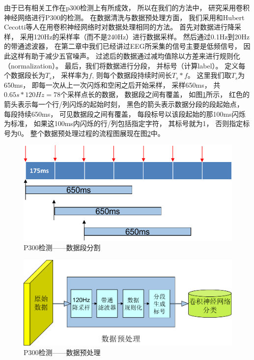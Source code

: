由于已有相关工作在p300检测上有所成效， 所以在我们的方法中， 研究采用卷积神经网络进行P300的检测。 在数据清洗与数据预处理方面， 我们采用和Hubert Cecotti等人在用卷积神经网络时对数据处理相同的方法\cite{cecotti2011convolutional}。 首先对数据进行降采样， 采用120Hz的采样率（而不是240Hz）进行数据采样。 然后通过0.1Hz到20Hz的带通滤波器， 在第二章中我们已经讲过EEG所采集的信号主要是低频信号， 因此这样有助于减少五官噪声。 过滤后的数据通过减均值除以方差来进行规则化（normalization）。 最后，我们将数据进行分段， 并标号（计算label）。 定义每个数据段长为$T_s$， 采样率为$f$, 则每个数据段持续时间长$T_s*f$。 这里我们取$T_s$为650ms， 即每一次从上一次闪烁和空闲之后开始采样， 采样650ms， 共$0.65s*120Hz=78$个采样点长的数据， 数据段之间有覆盖， 如图\ref{fig:data_segmentation}所示， 红色的箭头表示每一个行/列闪烁的起始时刻， 黑色的箭头表示数据分段的段起始点， 每段持续650ms， 可见数据段之间有覆盖， 每段标号以该段起始的那100ms闪烁为标准， 如果这100ms内闪烁的行/列包括指定字符， 其标号就为1， 否则指定标号为0。 整个数据预处理过程的流程图展现在图\ref{fig:data_preprocess_flow}中。

\begin{figure}[htb]
  \centering
  \includegraphics[scale=0.9]{Pictures/CNN/data_segmentation-crop.pdf}
  \caption{P300检测——数据段分割}\label{fig:data_segmentation}
\end{figure}

\begin{figure}[htb]
  \centering
  \includegraphics[scale=0.8]{Pictures/CNN/cnn_flow-crop.pdf}
  \caption{P300检测——数据预处理}\label{fig:data_preprocess_flow}
\end{figure}



